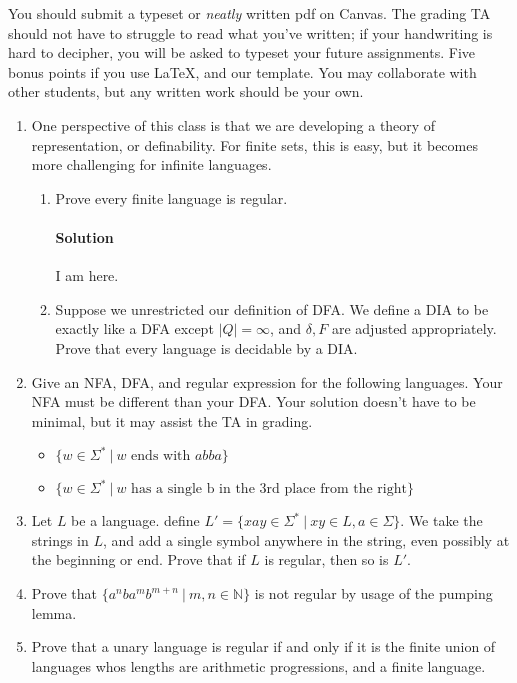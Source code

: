 \documentclass[11pt]{article}
\newcommand{\solution}[1]{\paragraph{Solution}  }
\begin{document}

You should submit a typeset or \emph{neatly} written pdf on Canvas.  The grading TA should not have to struggle to read what you've written; if your handwriting is hard to decipher, you will be asked to typeset your future assignments. Five bonus points if you use \LaTeX, and our template. You may collaborate with other students, but any written work should be your own. 


\begin{enumerate}

    \item 
    
    One perspective of this class is that we are developing a theory of representation, or definability. For finite sets, this is easy, but it becomes more challenging for infinite languages. 

    \begin{enumerate}
        \item Prove every finite language is regular.
            \solution{1}
            I am here.
        \item Suppose we unrestricted our definition of DFA. We define a DIA to be exactly like a DFA except $|Q|=\infty$, and $\delta, F$ are adjusted appropriately. Prove that every language is decidable by a DIA.
    \end{enumerate}
    
    \item Give an NFA, DFA, and regular expression for the following languages. Your NFA must be different than your DFA. Your solution doesn't have to be minimal, but it may assist the TA in grading. 
    \begin{itemize}
        \item $\{w \in \Sigma^* ~|~ w\text{ ends with } abba\}$
        \item $\{w \in \Sigma^* ~|~ w\text{ has a single b in the 3rd place from the right}\}$
    \end{itemize}
    
    \item Let $L$ be a language. define $L' = \{xay \in \Sigma^*~|~ xy \in L, a \in \Sigma\}$. We take the strings in $L$, and add a single symbol anywhere in the string, even possibly at the beginning or end. Prove that if $L$ is regular, then so is $L'$.

    \item Prove that $\{a^nba^mb^{m+n} ~|~ m,n \in \mathbb{N}\}$ is not regular by usage of the pumping lemma.
    
    \item Prove that a unary language is regular if and only if it is the finite union of languages whos lengths are arithmetic progressions, and a finite language.
\end{enumerate}
\end{document}

